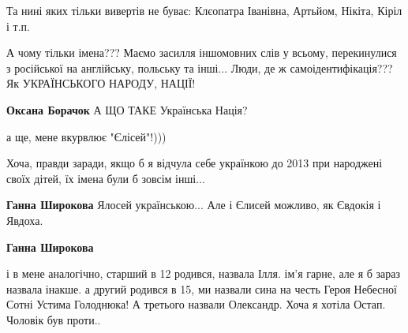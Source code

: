 \begin{itemize}
Та нині яких тільки вивертів не буває: Клєопатра Іванівна, Артьйом, Нікіта, Кіріл і т.п.

 

А чому тільки імена??? Маємо засилля іншомовних слів у всьому, перекинулися з
російської на англійську, польську та інші... Люди, де ж самоідентифікація??? Як
УКРАЇНСЬКОГО НАРОДУ, НАЦІЇ!

\begin{itemize}
 
\textbf{Оксана Борачок} А ЩО ТАКЕ Українська Нація?
\end{itemize}

 

а ще, мене вкурвлює "Єлісей"!)))

Хоча, правди заради, якщо б я відчула себе українкою до 2013 при народжені
своїх дітей, їх імена були б зовсім інші...

\begin{itemize}
 
\textbf{Ганна Широкова} Ялосей українською... Але і Єлисей можливо, як Євдокія і Явдоха.

 
\textbf{Ганна Широкова} 

і в мене аналогічно, старший в 12 родився, назвала Ілля. ім'я гарне, але я б зараз
назвала інакше. а другий родився в 15, ми назвали сина на честь Героя Небесної
Сотні Устима Голоднюка! А третього назвали Олександр. Хоча я хотіла
Остап. Чоловік був проти..



\end{itemize}
\end{itemize}
